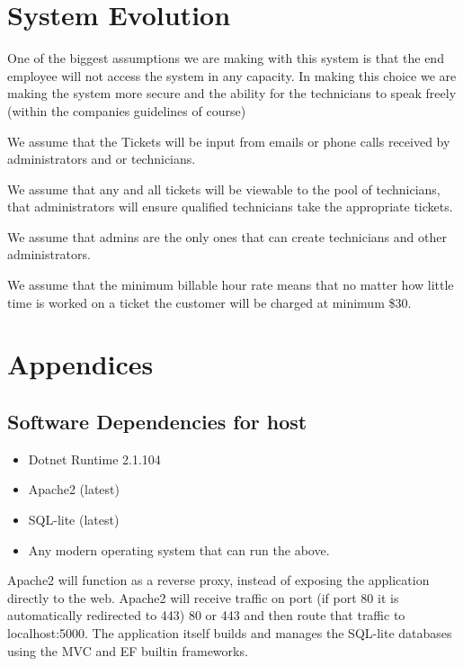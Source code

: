 \documentclass[letterpaper]{article}
\begin{document}
\section{System Evolution}
One of the biggest assumptions we are making with this system is that the end employee will not access the system in any capacity. In making this choice we are making the system more secure and the ability for the technicians to speak freely (within the companies guidelines of course)


We assume that the Tickets will be input from emails or phone calls received by administrators and or technicians. 

We assume that any and all tickets will be viewable to the pool of technicians, that administrators will ensure qualified technicians take the appropriate tickets.

We assume that admins are the only ones that can create technicians and other administrators.

We assume that the minimum billable hour rate means that no matter how little time is worked on a ticket the customer will be charged at minimum \$30.
\pagebreak

\section{Appendices}

\subsection{Software Dependencies for host}
  \begin{itemize}
    \item Dotnet Runtime 2.1.104
    \item Apache2 (latest)
    \item SQL-lite (latest)
    \item Any modern operating system that can run the above.
  \end{itemize}

  Apache2 will function as a reverse proxy, instead of exposing the application directly to the web. Apache2 will receive traffic on port (if port 80 it is automatically redirected to 443) 80 or 443 and then route that traffic to localhost:5000. 
  The application itself builds and manages the SQL-lite databases using the \gls{MVC} and \gls{EF} builtin frameworks.
\end{document}
